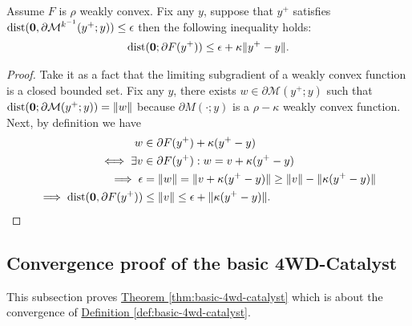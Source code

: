 \documentclass[12pt]{article}
\begin{document}
    \begin{lemma}\label{app:lemma:ncnvx-catalyst-stationary-cond}
        Assume $F$ is $\rho$ weakly convex. 
        Fix any $y$, suppose that $y^+$ satisfies $\operatorname{dist}(\mathbf 0,\partial \mathcal M^{k^{-1}}(y^+; y)) \le \epsilon$ then the following inequality holds: 
        \begin{align*}
            \operatorname{dist}(\mathbf 0; \partial F(y^+)) 
            \le \epsilon + \kappa\Vert y^+ - y\Vert. 
        \end{align*}
    \end{lemma}
    \begin{proof}
        Take it as a fact that the limiting subgradient of a weakly convex function is a closed bounded set. 
        Fix any $y$, there exists $w \in \partial \mathcal M(y^+; y)$ such that $\operatorname{dist}(\mathbf 0; \partial {\mathcal M}(y^+; y)) = \Vert w\Vert$ because $\partial M(\cdot;y)$ is a $\rho - \kappa$ weakly convex function. 
        Next, by definition we have
        \begin{align*}
            w &\in \partial F(y^+) + \kappa(y^+ - y)
            \\
            \iff 
            \exists v &
            \in \partial  F(y^+): 
            w = v + \kappa(y^+ - y)
            \\
            \implies 
            \epsilon &= 
            \Vert w\Vert = \Vert v + \kappa(y^+ - y)\Vert 
            \ge \Vert v\Vert - \Vert \kappa(y^+ - y)\Vert
            \\
            \implies 
            \operatorname{dist}(\mathbf 0, \partial F(y^+)) &\le 
            \Vert v\Vert 
            \le \epsilon + \Vert \kappa(y^+ - y)\Vert. 
        \end{align*}

    \end{proof}

    \subsection{Convergence proof of the basic 4WD-Catalyst}
        This subsection proves 
        \hyperref[thm:basic-4wd-catalyst]{Theorem \ref*{thm:basic-4wd-catalyst}}
        which is about the convergence of 
        \hyperref[def:basic-4wd-catalyst]{Definition \ref*{def:basic-4wd-catalyst}}. 
        
\end{document}
